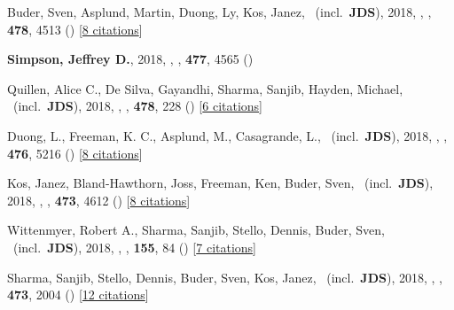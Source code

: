 \item[{\color{numcolor}\scriptsize19}] Buder, Sven, Asplund, Martin, Duong, Ly, Kos, Janez, \etal\ (incl.\ \textbf{JDS}), 2018, , \mnras, \textbf{478}, 4513 () [\href{http://adsabs.harvard.edu/abs/2018MNRAS.478.4513B}{8 citations}]

\item[{\color{numcolor}\scriptsize18}] \textbf{Simpson, Jeffrey D.}, 2018, , \mnras, \textbf{477}, 4565 ()

\item[{\color{numcolor}\scriptsize17}] Quillen, Alice C., De Silva, Gayandhi, Sharma, Sanjib, Hayden, Michael, \etal\ (incl.\ \textbf{JDS}), 2018, , \mnras, \textbf{478}, 228 () [\href{http://adsabs.harvard.edu/abs/2018MNRAS.478..228Q}{6 citations}]

\item[{\color{numcolor}\scriptsize16}] Duong, L., Freeman, K. C., Asplund, M., Casagrande, L., \etal\ (incl.\ \textbf{JDS}), 2018, , \mnras, \textbf{476}, 5216 () [\href{http://adsabs.harvard.edu/abs/2018MNRAS.476.5216D}{8 citations}]

\item[{\color{numcolor}\scriptsize15}] Kos, Janez, Bland-Hawthorn, Joss, Freeman, Ken, Buder, Sven, \etal\ (incl.\ \textbf{JDS}), 2018, , \mnras, \textbf{473}, 4612 () [\href{http://adsabs.harvard.edu/abs/2018MNRAS.473.4612K}{8 citations}]

\item[{\color{numcolor}\scriptsize14}] Wittenmyer, Robert A., Sharma, Sanjib, Stello, Dennis, Buder, Sven, \etal\ (incl.\ \textbf{JDS}), 2018, , \aj, \textbf{155}, 84 () [\href{http://adsabs.harvard.edu/abs/2018AJ....155...84W}{7 citations}]

\item[{\color{numcolor}\scriptsize13}] Sharma, Sanjib, Stello, Dennis, Buder, Sven, Kos, Janez, \etal\ (incl.\ \textbf{JDS}), 2018, , \mnras, \textbf{473}, 2004 () [\href{http://adsabs.harvard.edu/abs/2018MNRAS.473.2004S}{12 citations}]

